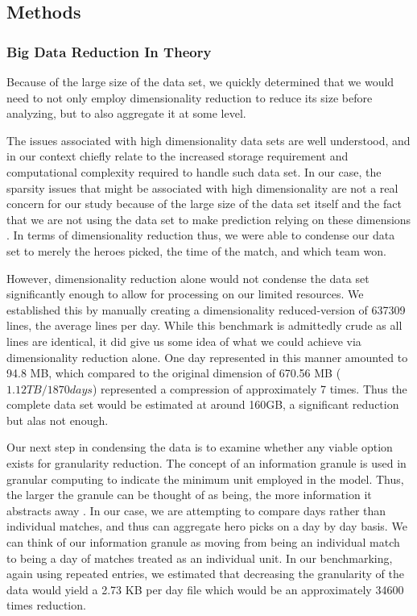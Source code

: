\subsection{Methods} %

\subsubsection{Big Data Reduction In Theory}
Because of the large size of the data set, we quickly determined that we would need to not only employ dimensionality reduction to reduce its size before analyzing, but to also aggregate it at some level.

The issues associated with high dimensionality data sets are well understood, and in our context chiefly relate to the increased storage requirement and computational complexity required to handle such data set. In our case, the sparsity issues that might be associated with high dimensionality are not a real concern for our study because of the large size of the data set itself and the fact that we are not using the data set to make prediction relying on these dimensions \cite{poreMustKnowWhatCurse2017, urrehmanBigDataReduction2016}. In terms of dimensionality reduction thus, we were able to condense our data set to merely the heroes picked, the time of the match, and which team won.

However, dimensionality reduction alone would not condense the data set significantly enough to allow for processing on our limited resources. We established this by manually creating a dimensionality reduced-version of 637309 lines, the average lines per day. While this benchmark is admittedly crude as all lines are identical, it did give us some idea of what we could achieve via dimensionality reduction alone. One day represented in this manner amounted to 94.8 MB, which compared to the original dimension of 670.56 MB ($1.12TB/1870 days$) represented a compression of approximately 7 times. Thus the complete data set would be estimated at around 160GB, a significant reduction but alas not enough.

Our next step in condensing the data is to examine whether any viable option exists for granularity reduction. The concept of an information granule is used in granular computing to indicate the minimum unit employed in the model. Thus, the larger the granule can be thought of as being, the more information it abstracts away \cite{yaoGranularComputing2004}. In our case, we are attempting to compare days rather than individual matches, and thus can aggregate hero picks on a day by day basis. We can think of our information granule as moving from being an individual match to being a day of matches treated as an individual unit. In our benchmarking, again using repeated entries, we estimated that decreasing the granularity of the data would yield a 2.73 KB per day file which would be an approximately 34600 times reduction.


